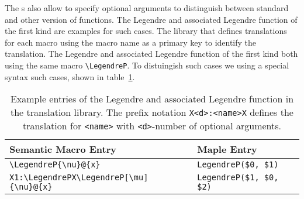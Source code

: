 

The \Macro s also allow to specify optional arguments to distinguish between standard and other version of functions. The Legendre and associated Legendre function of the first kind are examples for such cases. The library that defines translations for each macro using the macro name as a primary key to identify the translation. The Legendre and associated Legendre function of the first kind both using the same macro \verb|\LegendreP|. To distuingish such cases we using a special syntax such cases, shown in table~\ref{tab:legendreP-lex}.

\begin{table}[ht!]
	\centering
	\begin{tabular}{ll}
		\hline
		Semantic Macro Entry & Maple Entry \\
		\hline
		\verb|\LegendreP{\nu}@{x}| & \verb|LegendreP($0, $1)| \\
		\verb|X1:\LegendrePX\LegendreP[\mu]{\nu}@{x}| & \verb|LegendreP($1, $0, $2)|\\
		\hline
	\end{tabular}
	\caption{Example entries of the Legendre and associated Legendre function in the translation library. The prefix notation \texttt{X<d>:<name>X} defines the translation for \texttt{<name>} with \texttt{<d>}-number of optional arguments.}
	\label{tab:legendreP-lex}
\end{table}

